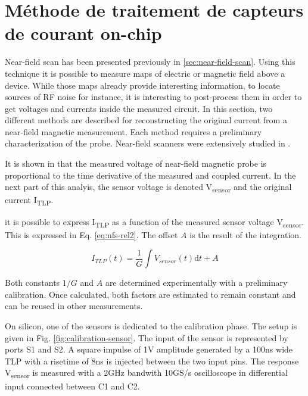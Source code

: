 \section{Méthode de traitement de capteurs de courant on-chip}

Near-field scan has been presented previously in \ref{sec:near-field-scan}.
Using this technique it is possible to measure maps of electric or magnetic field above a device.
While those maps already provide interesting information, to locate sources of RF noise for instance, it is interesting to post-process them in order to get voltages and currents inside the measured circuit.
In this section, two different methods are described for reconstructing the original current from a near-field magnetic measurement.
Each method requires a preliminary characterization of the probe.
Near-field scanners were extensively studied in \cite{near-field-scan, phd-monnereau}.

It is shown in \cite{near-field-scan} that the measured voltage of near-field magnetic probe is proportional to the time derivative of the measured and coupled current.
In the next part of this analyis, the sensor voltage is denoted V\textsubscript{sensor} and the original current I\textsubscript{TLP}.

it is possible to express I\textsubscript{TLP} as a function of the measured sensor voltage V\textsubscript{sensor}.
This is expressed in Eq. \ref{eq:nfs-rel2}.
The offset $A$ is the result of the integration.

\begin{equation}
I_{TLP}(t) = \frac{1}{G}\int V_{sensor}(t) \mathrm{d}t + A
\label{eq:nfs-rel2}
\end{equation}

Both constants $1/G$ and $A$ are determined experimentally with a preliminary calibration.
Once calculated, both factors are estimated to remain constant and can be reused in other measurements.

On silicon, one of the sensors is dedicated to the calibration phase.
The setup is given in Fig. \ref{fig:calibration-sensor}.
The input of the sensor is represented by ports S1 and S2.
A square impulse of 1V amplitude generated by a 100ns wide TLP with a risetime of 8ns is injected between the two input pins.
The response V\textsubscript{sensor} is measured with a 2GHz bandwith 10GS/s oscilloscope in differential input connected between C1 and C2.

